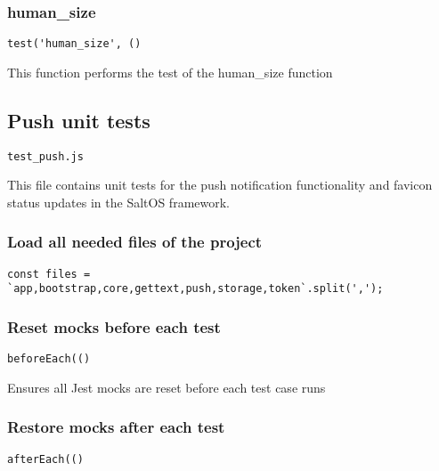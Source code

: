 \documentclass[a4paper]{article}
\begin{document}
\hypertarget{toc676}{}
\subsubsection{human\_size}

\begin{lstlisting}
test('human_size', ()
\end{lstlisting}

This function performs the test of the human\_size function

\hypertarget{toc677}{}
\subsection{Push unit tests}

\begin{lstlisting}
test_push.js
\end{lstlisting}

This file contains unit tests for the push notification functionality
and favicon status updates in the SaltOS framework.

\hypertarget{toc678}{}
\subsubsection{Load all needed files of the project}

\begin{lstlisting}
const files = `app,bootstrap,core,gettext,push,storage,token`.split(',');
\end{lstlisting}

\hypertarget{toc679}{}
\subsubsection{Reset mocks before each test}

\begin{lstlisting}
beforeEach(()
\end{lstlisting}

Ensures all Jest mocks are reset before each test case runs

\hypertarget{toc680}{}
\subsubsection{Restore mocks after each test}

\begin{lstlisting}
afterEach(()
\end{lstlisting}
\end{document}
